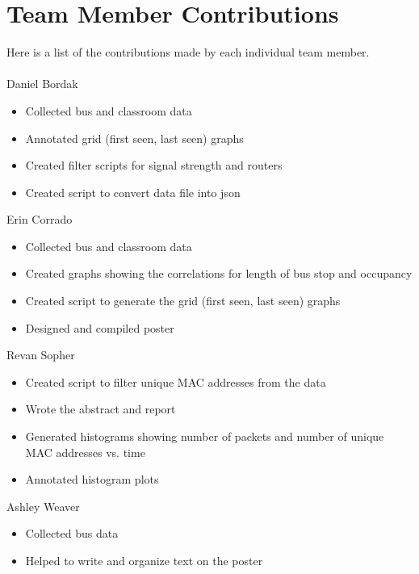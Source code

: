 \documentclass[letterpaper,abstract=on,titlepage=false]{scrreprt}
\begin{document}
\section*{Team Member Contributions}
Here is a list of the contributions made by each individual team member.
\\
\\
Daniel Bordak
\begin{itemize}
  \item Collected bus and classroom data
  \item Annotated grid (first seen, last seen) graphs
  \item Created filter scripts for signal strength and routers
  \item Created script to convert data file into json
\end{itemize}
\vspace{10 mm}
Erin Corrado
\begin{itemize}
  \item Collected bus and classroom data
  \item Created graphs showing the correlations for length of bus stop and occupancy
  \item Created script to generate the grid (first seen, last seen) graphs
  \item Designed and compiled poster
\end{itemize}
\vspace{10 mm}
Revan Sopher
\begin{itemize}
  \item Created script to filter unique MAC addresses from the data
  \item Wrote the abstract and report
  \item Generated histograms showing number of packets and number of unique MAC addresses vs. time
  \item Annotated histogram plots
\end{itemize}
\vspace{10 mm}
Ashley Weaver
\begin{itemize}
  \item Collected bus data
  \item Helped to write and organize text on the poster
\end{itemize}
\end{document}
